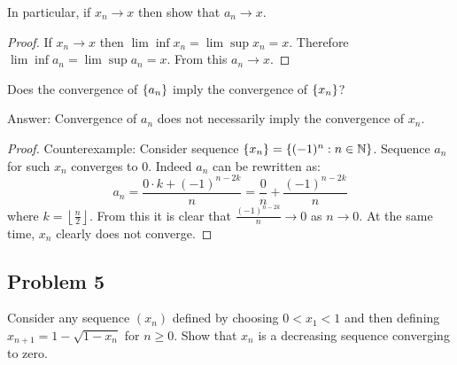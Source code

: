 \documentclass{article}
\newcommand{\N}{\mathbb{N}}
\DeclarePairedDelimiter{\set}{ \{ }{ \} }
\begin{document}
\begin{tcolorbox}
In particular, if $x_n \to x$ then show that $a_n \to x$.
\end{tcolorbox}

\begin{proof}

If $x_n \to x$ then $\lim \inf x_n = \lim \sup x_n = x$.
Therefore $\lim \inf a_n = \lim \sup a_n = x$.
From this $a_n \to x$.

\end{proof}

\begin{tcolorbox}
Does the convergence of $\set{a_n}$ imply the convergence of $\set{x_n}$?
\end{tcolorbox}

Answer: Convergence of $a_n$ does not necessarily imply the convergence of $x_n$.

\begin{proof}

Counterexample: Consider sequence $\set{ x_n } = \set{ (-1)^n : n \in \N }$. Sequence $a_n$ for such $x_n$ converges to $0$. Indeed $a_n$ can be rewritten as:
\[ a_n = \frac{0 \cdot k + (-1)^{n-2k}}{n} = \frac{0}{n} + \frac{(-1)^{n-2k}}{n} \]
where $k = \left \lfloor \frac{n}{2} \right \rfloor$.
From this it is clear that $\frac{(-1)^{n-2k}}{n} \to 0$ as $n \to 0$. At the same time, $x_n$ clearly does not converge.

\end{proof}


\subsection*{Problem 5}

\begin{tcolorbox}
Consider any sequence $(x_n)$ defined by choosing $0 < x_1 < 1$ and then defining $x_{n+1} = 1-\sqrt{1 - x_n}$ for $n \geq 0$.
Show that $x_n$ is a decreasing sequence converging to zero.
\end{tcolorbox}
\end{document}
